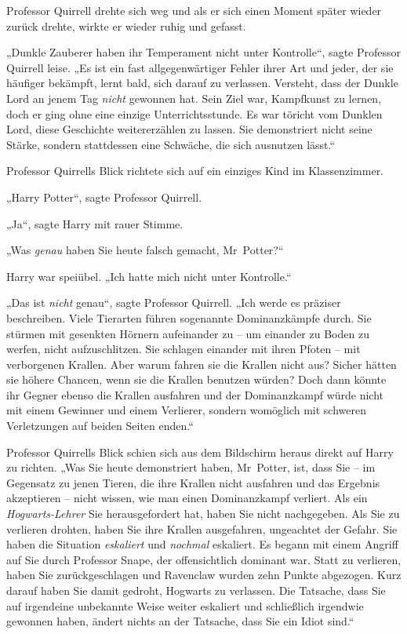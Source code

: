 {Professor Quirrell drehte sich weg und als er sich einen Moment später wieder zurück drehte, wirkte er wieder ruhig und gefasst.

„Dunkle Zauberer haben ihr Temperament nicht unter Kontrolle“, sagte Professor Quirrell leise. „Es ist ein fast allgegenwärtiger Fehler ihrer Art und jeder, der sie häufiger bekämpft, lernt bald, sich darauf zu verlassen. Versteht, dass der Dunkle Lord an jenem Tag \emph{nicht} gewonnen hat. Sein Ziel war, Kampfkunst zu lernen, doch er ging ohne eine einzige Unterrichtsstunde. Es war töricht vom Dunklen Lord, diese Geschichte weitererzählen zu lassen. Sie demonstriert nicht seine Stärke, sondern stattdessen eine Schwäche, die sich ausnutzen lässt.“

Professor Quirrells Blick richtete sich auf ein einziges Kind im Klassenzimmer.

„Harry Potter“, sagte Professor Quirrell.

„Ja“, sagte Harry mit rauer Stimme.

„Was \emph{genau} haben Sie heute falsch gemacht, Mr~Potter?“

Harry war speiübel. „Ich hatte mich nicht unter Kontrolle.“

„Das ist \emph{nicht} genau“, sagte Professor Quirrell. „Ich werde es präziser beschreiben. Viele Tierarten führen sogenannte Dominanzkämpfe durch. Sie stürmen mit gesenkten Hörnern aufeinander zu -- um einander zu Boden zu werfen, nicht aufzuschlitzen. Sie schlagen einander mit ihren Pfoten -- mit verborgenen Krallen. Aber warum fahren sie die Krallen nicht aus? Sicher hätten sie höhere Chancen, wenn sie die Krallen benutzen würden? Doch dann könnte ihr Gegner ebenso die Krallen ausfahren und der Dominanzkampf würde nicht mit einem Gewinner und einem Verlierer, sondern womöglich mit schweren Verletzungen auf beiden Seiten enden.“

Professor Quirrells Blick schien sich aus dem Bildschirm heraus direkt auf Harry zu richten. „Was Sie heute demonstriert haben, Mr~Potter, ist, dass Sie -- im Gegensatz zu jenen Tieren, die ihre Krallen nicht ausfahren und das Ergebnis akzeptieren -- nicht wissen, wie man einen Dominanzkampf verliert. Als ein \emph{Hogwarts-Lehrer} Sie herausgefordert hat, haben Sie nicht nachgegeben. Als Sie zu verlieren drohten, haben Sie ihre Krallen ausgefahren, ungeachtet der Gefahr. Sie haben die Situation \emph{eskaliert} und \emph{nochmal} eskaliert. Es begann mit einem Angriff auf Sie durch Professor Snape, der offensichtlich dominant war. Statt zu verlieren, haben Sie zurückgeschlagen und Ravenclaw wurden zehn Punkte abgezogen. Kurz darauf haben Sie damit gedroht, Hogwarts zu verlassen. Die Tatsache, dass Sie auf irgendeine unbekannte Weise weiter eskaliert und schließlich irgendwie gewonnen haben, ändert nichts an der Tatsache, dass Sie ein Idiot sind.“

}
